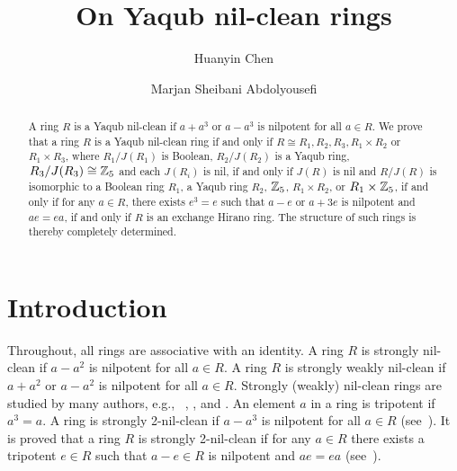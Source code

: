 \documentclass[12pt, reqno]{amsart}
\numberwithin{equation}{section}
\begin{document}
\title{On Yaqub nil-clean rings}

\author{Huanyin Chen}
\author{Marjan Sheibani Abdolyousefi}
\address{
Department of Mathematics\\ Hangzhou Normal University\\ Hang -zhou, China}
\address{
Farzanegan Semnan University\\ Semnan, Iran}


 

\begin{abstract}
A ring $R$ is a Yaqub nil-clean if $a+a^3$ or $a-a^3$ is nilpotent for all $a\in R$. We prove that a ring $R$ is a Yaqub nil-clean ring if and only if $R\cong R_1, R_2,R_3,R_1\times R_2$ or $R_1\times R_3$, where
$R_1/J(R_1)$ is Boolean, $R_2/J(R_2)$ is a Yaqub ring, $R_3/J(R_3)\cong {\Bbb Z}_5$ and each $J(R_i)$ is nil, if and only if $J(R)$ is nil and
$R/J(R)$ is isomorphic to a Boolean ring $R_1$, a Yaqub ring $R_2$, ${\Bbb Z}_5$, $R_1\times R_2$, or $R_1\times {\Bbb Z}_5$, if and only if for any $a\in R$, there exists $e^3=e$ such that $a-e$ or $a+3e$ is nilpotent and $ae=ea$, if and only if $R$ is an exchange Hirano ring. The structure of such rings is
thereby completely determined.
\end{abstract}

\maketitle

\section{Introduction}
Throughout, all rings are associative with an identity. A ring $R$ is strongly nil-clean if $a-a^2$ is nilpotent for all $a\in R$.
A ring $R$ is strongly weakly nil-clean if $a+a^2$ or $a-a^2$ is nilpotent for all $a\in R$.
Strongly (weakly) nil-clean rings are studied by many authors, e.g., ~\cite{BDZ, BGD}, \cite{CS2}, \cite{Da1,D} and \cite{KWZ, KWZ2}. An element $a$ in a ring is tripotent if $a^3=a$. A ring is strongly 2-nil-clean if $a-a^3$ is nilpotent for all $a\in R$ (see~\cite{CS}).
It is proved that a ring $R$ is strongly 2-nil-clean if for any $a\in R$ there exists a tripotent $e\in R$ such that $a-e\in R$ is nilpotent and
$ae=ea$ (see~\cite[Theorem 2.8]{CS}).
\end{document}

